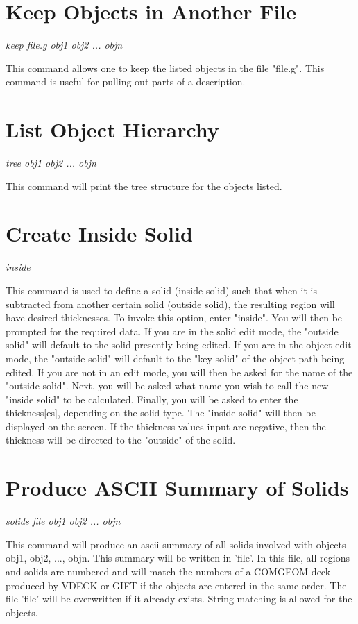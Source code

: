 \section{Keep Objects in Another File}

{\em \center
keep file.g obj1 obj2 ... objn
}

This command allows one to keep the listed objects in the file "file.g".
This command is useful for pulling out parts of a description.

\section{List Object Hierarchy}

{\em \center
tree obj1 obj2 ... objn
}

This command will print the tree structure for the objects listed.

\section{Create Inside Solid}

{\em \center
inside
}

This command is used to define a solid (inside solid) such that when it is subtracted
from another certain solid (outside solid), the resulting region will have desired
thicknesses.
To invoke this option, enter "inside".
You will then be prompted for the required data.
If you are in the solid edit mode, the "outside solid" will default to the
solid presently being edited.
If you are in the object edit mode, the "outside solid" will default to the
"key solid" of the object path being edited.
If you are not in an edit mode, you will then be asked for the name of
the "outside solid".
Next, you will be asked what name you wish to call the new "inside solid"
to be calculated.
Finally, you will be asked to enter the thickness[es], depending on the
solid type.
The "inside solid" will then be displayed on the screen.
If the thickness values input are negative, then the thickness will be
directed to the "outside" of the solid.

\section{Produce ASCII Summary of Solids}

{\em \center
solids file obj1 obj2 ... objn
}

This command will produce an ascii summary of all solids involved with
objects obj1, obj2, ..., objn.  This summary will be written in 'file'.
In this file, all regions and solids are numbered and will match the
numbers of a COMGEOM deck produced by VDECK or GIFT if the objects are
entered in the same order.
The file 'file' will be overwritten if it already exists.
String matching is allowed for the objects.

